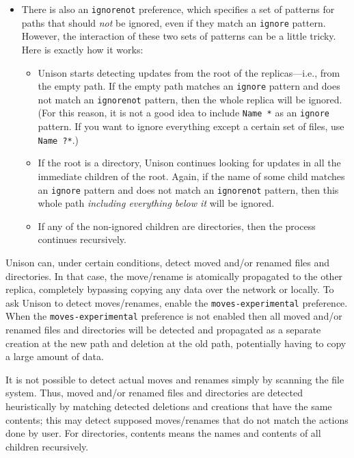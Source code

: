 \documentclass{article}
\begin{document}
\begin{itemize}
\item There is also an \verb|ignorenot| preference, which specifies a set of
  patterns for paths that should {\em not} be ignored, even if they match an
  \verb|ignore| pattern.  However, the interaction of these two sets of
  patterns can be a little tricky.  Here is exactly how it works:
  \begin{itemize}
  \item Unison starts detecting updates from the root of the
  replicas---i.e., from the empty path.  If the empty path matches an
  \verb|ignore| pattern and does not match an \verb|ignorenot| pattern, then
  the whole replica will be ignored.  (For this reason, it is not a good
  idea to include \verb|Name *| as an \verb|ignore| pattern.  If you want to
  ignore everything except a certain set of files, use \verb|Name ?*|.)
  \item If the root is a directory, Unison continues looking for updates in
  all the immediate children of the root.  Again, if the name of some child matches an
  \verb|ignore| pattern and does not match an \verb|ignorenot| pattern, then
  this whole path {\em including everything below it} will be ignored.
  \item If any of the non-ignored children are directories, then the process
  continues recursively.
  \end{itemize}
\end{itemize}



Unison can, under certain conditions, detect moved and/or renamed files and
directories. In that case, the move/rename is atomically propagated to the
other replica, completely bypassing copying any data over the network or
locally.  To ask Unison to detect moves/renames, enable the
\verb|moves-experimental| preference.  When the \verb|moves-experimental|
preference is not enabled then all moved and/or renamed files and directories
will be detected and propagated as a separate creation at the new path and
deletion at the old path, potentially having to copy a large amount of data.

It is not possible to detect actual moves and renames simply by scanning the
file system. Thus, moved and/or renamed files and directories are detected
heuristically by matching detected deletions and creations that have the same
contents; this may detect supposed moves/renames that do not match the actions
done by user.  For directories, contents means the names and contents of all
children recursively.
\end{document}
